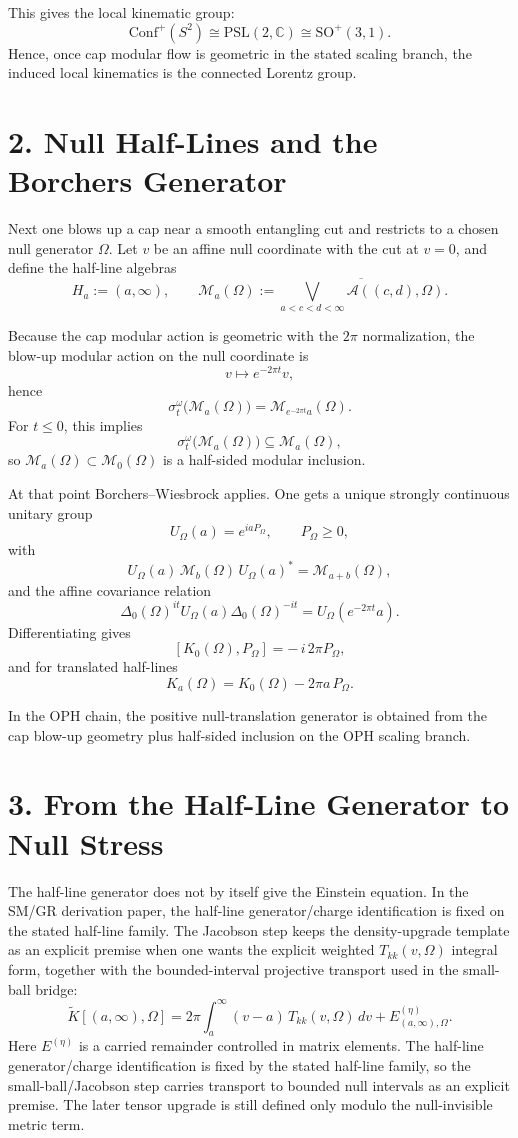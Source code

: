 \documentclass[10pt]{article}
\newcommand{\Conf}{\mathrm{Conf}}
\begin{document}
This gives the local kinematic group:
\[
\Conf^+(S^2) \cong \mathrm{PSL}(2,\mathbb C) \cong \mathrm{SO}^+(3,1).
\]
Hence, once cap modular flow is geometric in the stated scaling branch, the induced local kinematics is the connected Lorentz group.

\section*{2. Null Half-Lines and the Borchers Generator}

Next one blows up a cap near a smooth entangling cut and restricts to a chosen null generator \(\Omega\). Let \(v\) be an affine null coordinate with the cut at \(v=0\), and define the half-line algebras
\[
H_a := (a,\infty),
\qquad
\mathcal M_a(\Omega)
:=
\overline{\bigvee_{a<c<d<\infty}\mathcal A((c,d),\Omega)}.
\]

Because the cap modular action is geometric with the \(2\pi\) normalization, the blow-up modular action on the null coordinate is
\[
v \mapsto e^{-2\pi t} v,
\]
hence
\[
\sigma_t^\omega\bigl(\mathcal M_a(\Omega)\bigr)
=
\mathcal M_{e^{-2\pi t}a}(\Omega).
\]
For \(t \le 0\), this implies
\[
\sigma_t^\omega\bigl(\mathcal M_a(\Omega)\bigr) \subseteq \mathcal M_a(\Omega),
\]
so \(\mathcal M_a(\Omega) \subset \mathcal M_0(\Omega)\) is a half-sided modular inclusion.

At that point Borchers--Wiesbrock applies. One gets a unique strongly continuous unitary group
\[
U_\Omega(a) = e^{i a P_\Omega},
\qquad
P_\Omega \ge 0,
\]
with
\[
U_\Omega(a)\,\mathcal M_b(\Omega)\,U_\Omega(a)^* = \mathcal M_{a+b}(\Omega),
\]
and the affine covariance relation
\[
\Delta_0(\Omega)^{it} U_\Omega(a)\Delta_0(\Omega)^{-it}
=
U_\Omega(e^{-2\pi t} a).
\]
Differentiating gives
\[
[K_0(\Omega),P_\Omega] = -\,i\,2\pi P_\Omega,
\]
and for translated half-lines
\[
K_a(\Omega)=K_0(\Omega)-2\pi a\,P_\Omega.
\]

In the OPH chain, the positive null-translation generator is obtained from the cap blow-up geometry plus half-sided inclusion on the OPH scaling branch.

\section*{3. From the Half-Line Generator to Null Stress}

The half-line generator does not by itself give the Einstein equation. In the SM/GR derivation paper, the half-line generator/charge identification is fixed on the stated half-line family. The Jacobson step keeps the density-upgrade template as an explicit premise when one wants the explicit weighted \(T_{kk}(v,\Omega)\) integral form, together with the bounded-interval projective transport used in the small-ball bridge:
\[
\widetilde K[(a,\infty),\Omega]
=
2\pi\int_a^\infty (v-a)\,T_{kk}(v,\Omega)\,dv
+
E^{(\eta)}_{(a,\infty),\Omega}.
\]
Here \(E^{(\eta)}\) is a carried remainder controlled in matrix elements. The half-line generator/charge identification is fixed by the stated half-line family, so the small-ball/Jacobson step carries transport to bounded null intervals as an explicit premise. The later tensor upgrade is still defined only modulo the null-invisible metric term.
\end{document}
